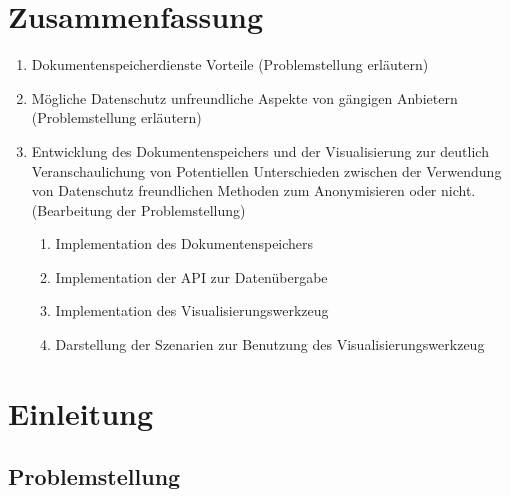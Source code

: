 \documentclass[
    fontsize=12pt,
    headings=small,
    parskip=half,           %
    bibliography=totoc,
    numbers=noenddot,       %
    open=any,               %
    ]{scrreprt}
\begin{document}
\chapter*{Zusammenfassung}
\begin{enumerate}
\item Dokumentenspeicherdienste Vorteile (Problemstellung erläutern)
\item Mögliche Datenschutz unfreundliche Aspekte von gängigen Anbietern (Problemstellung erläutern)
\item Entwicklung des Dokumentenspeichers und der Visualisierung zur deutlich Veranschaulichung von Potentiellen Unterschieden zwischen der Verwendung von Datenschutz freundlichen Methoden zum Anonymisieren oder nicht. (Bearbeitung der Problemstellung)
\begin{enumerate}
\item Implementation des Dokumentenspeichers
\item Implementation der API zur Datenübergabe 
\item Implementation des Visualisierungswerkzeug
\item Darstellung der Szenarien zur Benutzung des Visualisierungswerkzeug
\end{enumerate}
\end{enumerate}

\tableofcontents

\chapter{Einleitung}

\section{Problemstellung}
\end{document}
